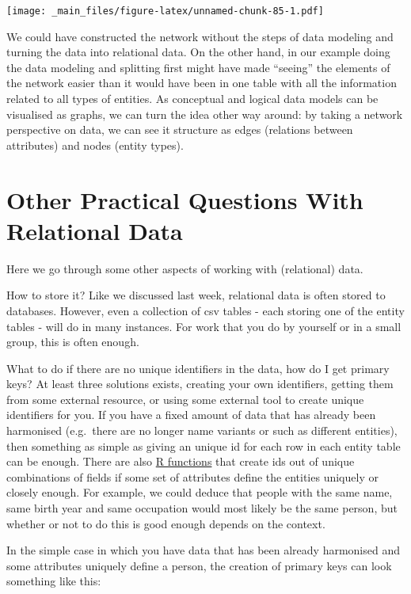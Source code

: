 \documentclass[
]{book}
\begin{document}
\texttt{[image: \_main\_files/figure-latex/unnamed-chunk-85-1.pdf]}

We could have constructed the network without the steps of data modeling and turning the data into relational data. On the other hand,
in our example doing the data modeling and splitting first might have made ``seeing'' the elements of the network easier than
it would have been in one table with all the information related to all types of entities. As conceptual and logical data models can be visualised as graphs, we can turn the idea other way around: by taking a network perspective on data, we can see it structure as edges (relations between attributes) and nodes (entity types).

\hypertarget{other-practical-questions-with-relational-data}{%
\section{Other Practical Questions With Relational Data}\label{other-practical-questions-with-relational-data}}

Here we go through some other aspects of working with (relational) data.

How to store it? Like we discussed last week, relational data is often stored to databases. However, even a collection of csv tables - each storing one of the entity tables - will do in many instances. For work that you do by yourself or in a small group, this is often enough.

What to do if there are no unique identifiers in the data, how do I get primary keys? At least three solutions exists, creating your own identifiers, getting them from some external resource, or using some external tool to create unique identifiers for you. If you have a fixed amount of data that has already been harmonised (e.g.~there are no longer name variants or such as different entities), then something as simple as giving an unique id for each row in each entity table can be enough. There are also \href{https://www.rdocumentation.org/packages/udpipe/versions/0.5/topics/unique_identifier}{R functions} that create ids out of unique combinations of fields if some set of attributes define the entities uniquely or closely enough. For example, we could deduce that people with the same name, same birth year and same occupation would most likely be the same person, but whether or not to do this is good enough depends on the context.

In the simple case in which you have data that has been already harmonised and some attributes uniquely define a person, the creation of primary keys can look something like this:
\end{document}
